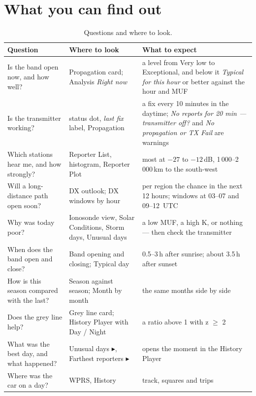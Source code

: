 \documentclass[10pt,a4paper]{article}
\begin{document}
\section{What you can find out}\label{sec:questions}
\begin{table}[H]\centering\small
\begin{tabularx}{\textwidth}{@{}>{\raggedright\arraybackslash}p{4.6cm}>{\raggedright\arraybackslash}p{4.4cm}X@{}}\toprule
Question & Where to look & What to expect\\\midrule
Is the band open now, and how well? & Propagation card; Analysis \emph{Right now} & a level from Very low to Exceptional, and below it \emph{Typical for this hour} or better against the hour and MUF \\
Is the transmitter working? & status dot, \emph{last fix} label, Propagation & a fix every 10 minutes in the daytime; \emph{No reports for 20 min --- transmitter off?} and \emph{No propagation or TX Fail} are warnings \\
Which stations hear me, and how strongly? & Reporter List, histogram, Reporter Plot & most at $-27$ to $-12$\,dB, 1\,000--2\,000\,km to the south-west \\
Will a long-distance path open soon? & DX outlook; DX windows by hour & per region the chance in the next 12 hours; windows at 03--07 and 09--12~UTC \\
Why was today poor? & Ionosonde view, Solar Conditions, Storm days, Unusual days & a low MUF, a high K, or nothing --- then check the transmitter \\
When does the band open and close? & Band opening and closing; Typical day & 0.5--3\,h after sunrise; about 3.5\,h after sunset \\
How is this season compared with the last? & Season against season; Month by month & the same months side by side \\
Does the grey line help? & Grey line card; History Player with Day / Night & a ratio above 1 with z $\ge$ 2 \\
What was the best day, and what happened? & Unusual days $\blacktriangleright$, Farthest reporters $\blacktriangleright$ & opens the moment in the History Player \\
Where was the car on a day? & WPRS, History & track, squares and trips \\\bottomrule
\end{tabularx}
\caption{Questions and where to look.}
\end{table}
\end{document}
